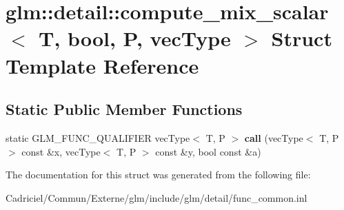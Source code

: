 \hypertarget{structglm_1_1detail_1_1compute__mix__scalar_3_01_t_00_01bool_00_01_p_00_01vec_type_01_4}{}\section{glm\+:\+:detail\+:\+:compute\+\_\+mix\+\_\+scalar$<$ T, bool, P, vec\+Type $>$ Struct Template Reference}
\label{structglm_1_1detail_1_1compute__mix__scalar_3_01_t_00_01bool_00_01_p_00_01vec_type_01_4}
\subsection*{Static Public Member Functions}
\begin{DoxyCompactItemize}
\item 
static G\+L\+M\+\_\+\+F\+U\+N\+C\+\_\+\+Q\+U\+A\+L\+I\+F\+I\+ER vec\+Type$<$ T, P $>$ {\bfseries call} (vec\+Type$<$ T, P $>$ const \&x, vec\+Type$<$ T, P $>$ const \&y, bool const \&a)\hypertarget{structglm_1_1detail_1_1compute__mix__scalar_3_01_t_00_01bool_00_01_p_00_01vec_type_01_4_a32b46dd2110b41d9c7b98fc90b9a88b1}{}\label{structglm_1_1detail_1_1compute__mix__scalar_3_01_t_00_01bool_00_01_p_00_01vec_type_01_4_a32b46dd2110b41d9c7b98fc90b9a88b1}

\end{DoxyCompactItemize}


The documentation for this struct was generated from the following file\+:\begin{DoxyCompactItemize}
\item 
Cadriciel/\+Commun/\+Externe/glm/include/glm/detail/func\+\_\+common.\+inl\end{DoxyCompactItemize}
